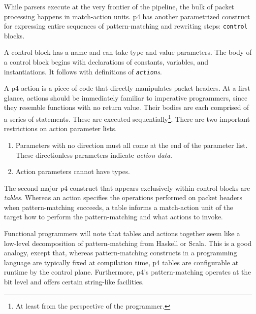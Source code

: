 

While parsers execute at the very frontier of the pipeline, the bulk of packet
processing happens in match-action units.
\acrshort{p4} has another parametrized construct for expressing entire sequences
of pattern-matching and rewriting steps: \texttt{control} blocks.

A control block has a name and can take type and value parameters. The body of a
control block begins with declarations of constants, variables, and
instantiations. It follows with definitions of \emph{\texttt{action}s}.

A \acrshort{p4} action is a piece of code that directly
manipulates packet headers. At a first glance, actions should be immediately
familiar to imperative programmers, since they resemble functions with no return
value. Their bodies are each comprised of a series of statements. These are
executed sequentially\footnote{At least from the perspective of the
programmer.}. There are two important restrictions on action parameter lists.

\begin{enumerate}
	\item Parameters with no direction must all come at the end of the parameter
	list. These directionless parameters indicate \emph{action
	data}.
	\item Action parameters cannot have \extern{} types.
\end{enumerate}

The second major \acrshort{p4} construct that appears exclusively
within control blocks are \emph{tables}. Whereas an action specifies the
operations performed on packet headers when pattern-matching succeeds, a table
informs a match-action unit of the target how to perform the pattern-matching
and what actions to invoke.

Functional programmers will note that tables and actions together seem like a
low-level decomposition of pattern-matching from Haskell or Scala. This is a
good analogy, except that, whereas pattern-matching constructs in a programming
language are typically fixed at compilation time, \acrshort{p4} tables are
configurable at runtime by the control plane. Furthermore, \acrshort{p4}'s
pattern-matching operates at the bit level and offers certain string-like
facilities.

